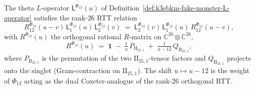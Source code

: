\begin{theorem}
\label{thm:k3ebkm-fake-monster-rtt}
The theta $L$-operator $\mathsf L^{\Phi_{12}}(u)$ of
Definition~\ref{def:k3ebkm-fake-monster-L-operator} satisfies the
rank-$26$ RTT relation
\begin{equation}
\label{eq:fake-monster-RTT}
 R^{\Phi_{12}}_{12}(u - v)\,\mathsf L^{\Phi_{12}}_1(u)\,\mathsf L^{\Phi_{12}}_2(v)
 \;=\;
 \mathsf L^{\Phi_{12}}_2(v)\,\mathsf L^{\Phi_{12}}_1(u)\,R^{\Phi_{12}}_{12}(u - v),
\end{equation}
with $R^{\Phi_{12}}(u)$ the orthogonal rational $R$-matrix on
$\mathbb C^{26}\otimes\mathbb C^{26}$,
\[
 R^{\Phi_{12}}(u) \;=\;
 \mathbf 1 \;-\; \tfrac{1}{u}\,P_{\mathrm{II}_{25,1}}
 \;+\; \tfrac{1}{u - 12}\,Q_{\mathrm{II}_{25,1}},
\]
where $P_{\mathrm{II}_{25,1}}$ is the permutation of the two
$\mathrm{II}_{25,1}$-tensor factors and $Q_{\mathrm{II}_{25,1}}$
projects onto the singlet (Gram-contraction on $\mathrm{II}_{25,1}$).
The shift $u\mapsto u-12$ is the weight of $\Phi_{12}$ acting as the
dual Coxeter-analogue of the rank-$26$ orthogonal RTT.
\end{theorem}

